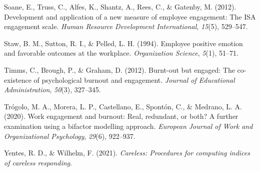 \documentclass[
  man]{apa6}
\newlength{\cslhangindent}
\newlength{\cslentryspacingunit} %
\newenvironment{CSLReferences}[2] %
 {%
  \setlength{\parindent}{0pt}
  \ifodd #1
  \let\oldpar\par
  \def\par{\hangindent=\cslhangindent\oldpar}
  \fi
  \setlength{\parskip}{#2\cslentryspacingunit}
 }%
 {}
\begin{document}
\begin{CSLReferences}{1}{0}
\leavevmode{}%
Soane, E., Truss, C., Alfes, K., Shantz, A., Rees, C., \& Gatenby, M. (2012). Development and application of a new measure of employee engagement: The ISA engagement scale. \emph{Human Resource Development International}, \emph{15}(5), 529--547.

\leavevmode{}%
Staw, B. M., Sutton, R. I., \& Pelled, L. H. (1994). Employee positive emotion and favorable outcomes at the workplace. \emph{Organization Science}, \emph{5}(1), 51--71.

\leavevmode{}%
Timms, C., Brough, P., \& Graham, D. (2012). Burnt-out but engaged: The co-existence of psychological burnout and engagement. \emph{Journal of Educational Administration}, \emph{50}(3), 327--345.

\leavevmode{}%
Trógolo, M. A., Morera, L. P., Castellano, E., Spontón, C., \& Medrano, L. A. (2020). Work engagement and burnout: Real, redundant, or both? A further examination using a bifactor modelling approach. \emph{European Journal of Work and Organizational Psychology}, \emph{29}(6), 922--937.

\leavevmode{}%
Yentes, R. D., \& Wilhelm, F. (2021). \emph{Careless: Procedures for computing indices of careless responding}.

\end{CSLReferences}
\end{document}
